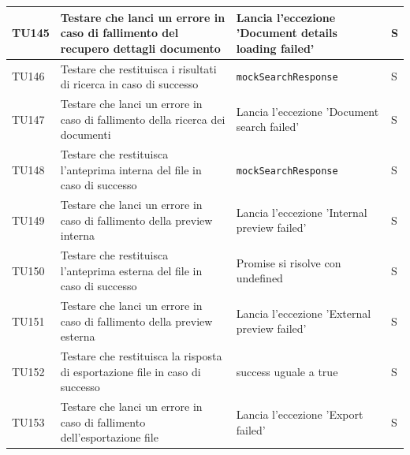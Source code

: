 \documentclass[a4paper,12pt]{article}
\begin{document}
\begin{longtable}{|M{1.2cm}|M{5cm}|M{8cm}|M{1.5cm}|}
            TU145 & Testare che \texttt{} lanci un errore in caso di fallimento del recupero dettagli documento & Lancia l'eccezione 'Document details loading failed' & S \\
            \hline

            TU146 & Testare che \texttt{} restituisca i risultati di ricerca in caso di successo & \texttt{mockSearchResponse} & S \\
            \hline

            TU147 & Testare che \texttt{} lanci un errore in caso di fallimento della ricerca dei documenti & Lancia l'eccezione 'Document search failed' & S \\
            \hline

            TU148 & Testare che \texttt{} restituisca l'anteprima interna del file in caso di successo & \texttt{mockSearchResponse} & S \\
            \hline

            TU149 & Testare che \texttt{} lanci un errore in caso di fallimento della preview interna & Lancia l'eccezione 'Internal preview failed' & S \\
            \hline

            TU150 & Testare che \texttt{} restituisca l'anteprima esterna del file in caso di successo & Promise si risolve con undefined & S \\
            \hline

            TU151 & Testare che \texttt{} lanci un errore in caso di fallimento della preview esterna & Lancia l'eccezione 'External preview failed' & S \\
            \hline

            TU152 & Testare che \texttt{} restituisca la risposta di esportazione file in caso di successo & success uguale a true & S \\
            \hline

            TU153 & Testare che \texttt{} lanci un errore in caso di fallimento dell'esportazione file & Lancia l'eccezione 'Export failed' & S \\
            \hline


\end{longtable}
\end{document}
